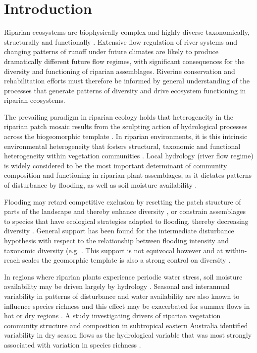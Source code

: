 \documentclass[openright,12pt,a4paper]{memoir}
\begin{document}
\clearpage

\section{Introduction}
Riparian ecosystems are biophysically complex and highly diverse taxonomically, structurally and functionally \cite{Naiman1993, Poff2002, Nilsson2002}. Extensive flow regulation of river systems and changing patterns of runoff under future climates are likely to produce dramatically different future flow regimes, with significant consequences for the diversity and functioning of riparian assemblages. Riverine conservation and rehabilitation efforts must therefore be informed by general understanding of the processes that generate patterns of diversity and drive ecosystem functioning in riparian ecosystems.

The prevailing paradigm in riparian ecology holds that heterogeneity in the riparian patch mosaic results from the sculpting action of hydrological processes across the biogeomorphic template \cite{Tabacchi1996, Palmer1997, Corenblit2007, Bornette2008}. In riparian environments, it is this intrinsic environmental heterogeneity that fosters structural, taxonomic and functional heterogeneity within vegetation communities \cite{Naiman1993, Corenblit2007, Bornette2008}. Local hydrology (river flow regime) is widely considered to be the most important determinant of community composition and functioning in riparian plant assemblages, as it dictates patterns of disturbance by flooding, as well as soil moisture availability \cite{Poff1997, Arthington2010}.

Flooding may retard competitive exclusion by resetting the patch structure of parts of the landscape and thereby enhance diversity \cite{Huston1979, Naiman1993}, or constrain assemblages to species that have ecological strategies adapted to flooding, thereby decreasing diversity \cite{Diaz1998}. General support has been found for the intermediate disturbance hypothesis \cite{connell1978diversity} with respect to the relationship between flooding intensity and taxonomic diversity (e.g. \cite{Bendix1997, Bendix2000, Lite2005, Corenblit2007}. This support is not equivocal however \cite{Nilsson1989, Baker1990} and at within-reach scales the geomorphic template is also a strong control on diversity \cite{Bendix1997, ODonnell2014}.
 
In regions where riparian plants experience periodic water stress, soil moisture availability may be driven largely by hydrology \cite{Castelli2000, Nilsson2002}. Seasonal and interannual variability in patterns of disturbance and water availability are also known to influence species richness \cite{Greet2011, Catford2012, Catford2014} and this effect may be exacerbated for summer flows in hot or dry regions \cite{Garssen2014}. A study investigating drivers of riparian vegetation community structure and composition in subtropical eastern Australia identified variability in dry season flows as the hydrological variable that was most strongly associated with variation in species richness \cite{Arthingon2012}.
 
\end{document}
